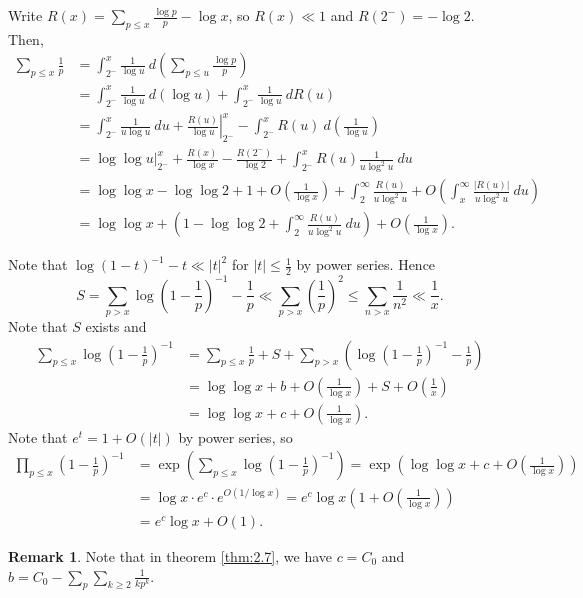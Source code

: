 \documentclass[11pt]{article}
\theoremstyle{definition}
\newtheorem{remark}[thm]{Remark}
\newcommand{\abs}[1]{\left\lvert#1\right\rvert} %
\begin{document}
\proof[Proof of (d)]
Write $R(x)=\sum_{p\le x}\frac{\log p}p-\log x$, so $R(x)\ll1$ and $R(2^-)=-\log2$. Then,
\begin{align*}
\sum_{p\le x}\frac1p
&= \int_{2^-}^x \frac1{\log u} ~d\left(\sum_{p\le u}\frac{\log p}p\right) \\
&= \int_{2^-}^x \frac1{\log u} ~d(\log u) + \int_{2^-}^x\frac1{\log u} ~dR(u) \\
&= \int_{2^-}^x \frac1{u\log u} ~du + \left.\frac{R(u)}{\log u}\right|_{2^-}^x
- \int_{2^-}^x R(u) ~d\left(\frac1{\log u}\right) \\
&= \left.\log\log u\right|_{2^-}^x + \frac{R(x)}{\log x} - \frac{R(2^-)}{\log2}
+ \int_{2^-}^x R(u)\frac1{u\log^2u}~du \\
&= \log\log x-\log\log2 + 1 + O\left(\frac1{\log x}\right)
+ \int_2^\infty \frac{R(u)}{u\log^2u}
+ O\left(\int_x^\infty\frac{\abs{R(u)}}{u\log^2u}~du\right) \\
&= \log\log x + \left(1-\log\log2 + \int_2^\infty\frac{R(u)}{u\log^2u}~du\right)
+ O\left(\frac1{\log x}\right) .
\end{align*}
\qedhere

\proof[Proof of (e)]
Note that $\log(1-t)^{-1}-t\ll\abs{t}^2$ for $\abs{t}\le\frac12$ by power series. Hence
\[
S = \sum_{p>x}\log\left(1-\frac1p\right)^{-1}-\frac1p
\ll \sum_{p>x}\left(\frac1p\right)^2 \le \sum_{n>x}\frac1{n^2}
\ll \frac1x .
\]
Note that $S$ exists and
\begin{align*}
\sum_{p\le x}\log\left(1-\frac1p\right)^{-1}
&= \sum_{p\le x}\frac1p + S
+ \sum_{p>x}\left(\log\left(1-\frac1p\right)^{-1}-\frac1p\right) \\
&= \log\log x + b + O\left(\frac1{\log x}\right) + S + O\left(\frac1x\right) \\
&= \log\log x + c + O\left(\frac1{\log x}\right) .
\end{align*}
Note that $e^t=1+O\left(\abs{t}\right)$ by power series, so
\begin{align*}
\prod_{p\le x}\left(1-\frac1p\right)^{-1}
&= \exp\left(\sum_{p\le x}\log\left(1-\frac1p\right)^{-1}\right)
= \exp\left(\log\log x + c + O\left(\frac1{\log x}\right)\right) \\
&= \log x \cdot e^c \cdot e^{O\left(1/\log x\right)}
= e^c\log x\left(1 + O\left(\frac1{\log x}\right)\right) \\
&= e^c\log x + O(1) .
\end{align*}
\qedhere

\begin{remark}
Note that in theorem \ref{thm:2.7}, we have $c=C_0$ and
$b=C_0-\sum_p\sum_{k\ge2}\frac1{kp^k}$.
\end{remark}
\end{document}

